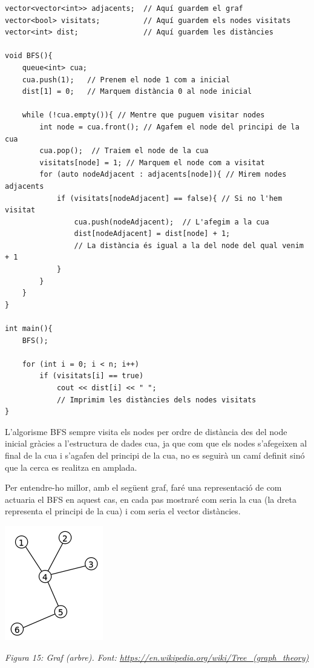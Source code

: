 \begin{lstlisting}
vector<vector<int>> adjacents;  // Aquí guardem el graf
vector<bool> visitats;          // Aquí guardem els nodes visitats
vector<int> dist;               // Aquí guardem les distàncies

void BFS(){
    queue<int> cua;
    cua.push(1);   // Prenem el node 1 com a inicial    
    dist[1] = 0;   // Marquem distància 0 al node inicial
    
    while (!cua.empty()){ // Mentre que puguem visitar nodes
        int node = cua.front(); // Agafem el node del principi de la cua
        cua.pop();  // Traiem el node de la cua
        visitats[node] = 1; // Marquem el node com a visitat
        for (auto nodeAdjacent : adjacents[node]){ // Mirem nodes adjacents
            if (visitats[nodeAdjacent] == false){ // Si no l'hem visitat
                cua.push(nodeAdjacent);  // L'afegim a la cua
                dist[nodeAdjacent] = dist[node] + 1; 
                // La distància és igual a la del node del qual venim + 1
            }
        }
    }
}

int main(){ 
    BFS();  

    for (int i = 0; i < n; i++)
        if (visitats[i] == true)
            cout << dist[i] << " "; 
            // Imprimim les distàncies dels nodes visitats
}
\end{lstlisting}


L'algorisme BFS sempre visita els nodes per ordre de distància des del node inicial gràcies a l'estructura de dades cua, ja que com que els nodes s'afegeixen al final de la cua i s'agafen del principi de la cua, no es seguirà un camí definit sinó que la cerca es realitza en amplada.

Per entendre-ho millor, amb el següent graf, faré una representació de com actuaria el BFS en aquest cas, en cada pas mostraré com seria la cua (la dreta representa el principi de la cua) i com seria el vector distàncies. \newpage



\begin{center}
    \includegraphics[width=.4 \textwidth]{tree.png}
    
    \caption{\emph{Figura 15: Graf (arbre). Font: \url{https://en.wikipedia.org/wiki/Tree_(graph_theory)}}}
\end{center}



